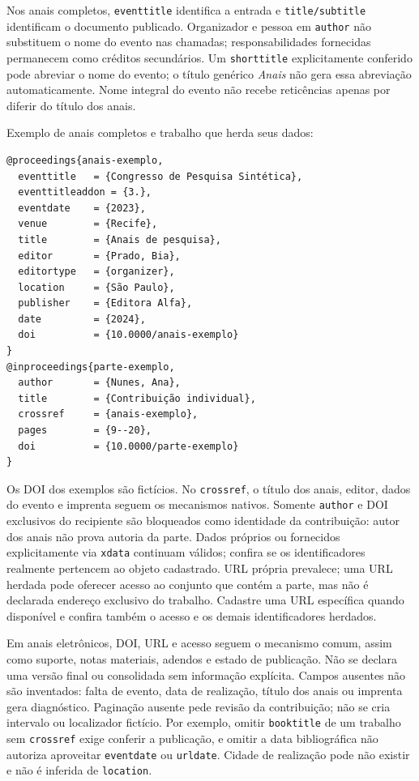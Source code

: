 Nos anais completos, \texttt{eventtitle} identifica a entrada e
\texttt{title/subtitle} identificam o documento publicado. Organizador e pessoa
em \texttt{author} não substituem o nome do evento nas chamadas; responsabilidades
fornecidas permanecem como créditos secundários. Um \texttt{shorttitle}
explicitamente conferido pode abreviar o nome do evento; o título genérico
\emph{Anais} não gera essa abreviação automaticamente. Nome integral do evento
não recebe reticências apenas por diferir do título dos anais.

\begin{samepage}
Exemplo de anais completos e trabalho que herda seus dados:
\begin{verbatim}
@proceedings{anais-exemplo,
  eventtitle   = {Congresso de Pesquisa Sintética},
  eventtitleaddon = {3.},
  eventdate    = {2023},
  venue        = {Recife},
  title        = {Anais de pesquisa},
  editor       = {Prado, Bia},
  editortype   = {organizer},
  location     = {São Paulo},
  publisher    = {Editora Alfa},
  date         = {2024},
  doi          = {10.0000/anais-exemplo}
}
@inproceedings{parte-exemplo,
  author       = {Nunes, Ana},
  title        = {Contribuição individual},
  crossref     = {anais-exemplo},
  pages        = {9--20},
  doi          = {10.0000/parte-exemplo}
}
\end{verbatim}
\end{samepage}

Os DOI dos exemplos são fictícios. No \texttt{crossref}, o título dos anais,
editor, dados do evento e imprenta seguem os mecanismos nativos. Somente
\texttt{author} e DOI exclusivos do recipiente são bloqueados como identidade
da contribuição: autor dos anais não prova autoria da parte. Dados próprios
ou fornecidos explicitamente via \texttt{xdata} continuam válidos; confira se
os identificadores realmente pertencem ao objeto cadastrado. URL própria
prevalece; uma URL herdada pode oferecer acesso ao conjunto que contém a parte,
mas não é declarada endereço exclusivo do trabalho. Cadastre uma URL específica
quando disponível e confira também o acesso e os demais identificadores herdados.

Em anais eletrônicos, DOI, URL e acesso seguem o mecanismo comum, assim como
suporte, notas materiais, adendos e estado de publicação. Não se declara uma
versão final ou consolidada sem informação explícita. Campos ausentes não são
inventados: falta de evento, data de realização, título dos anais ou imprenta
gera diagnóstico. Paginação ausente pede revisão da contribuição; não se cria
intervalo ou localizador fictício. Por exemplo, omitir \texttt{booktitle} de um
trabalho sem \texttt{crossref} exige conferir a publicação, e omitir a data
bibliográfica não autoriza aproveitar \texttt{eventdate} ou \texttt{urldate}.
Cidade de realização pode não existir e não é inferida de \texttt{location}.

